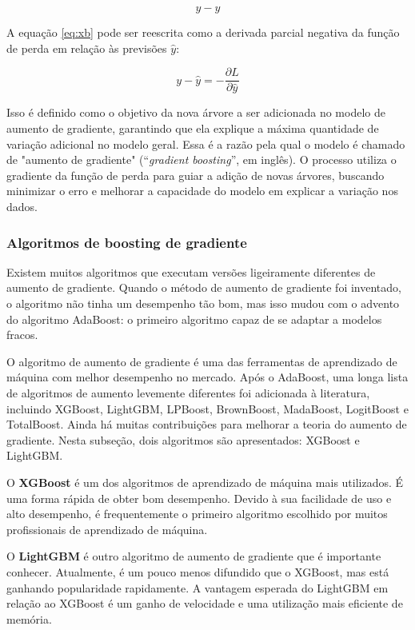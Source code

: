 \begin{equation}
	y-\hat{y} \label{eq:xb}
\end{equation}

A equação \eqref{eq:xb} pode ser reescrita como a derivada parcial negativa da função de perda em relação às previsões $\hat{y}$:

\begin{equation}
	y-\hat{y} = -\frac{\partial L}{\partial \hat{y}} \label{eq:xb2}
\end{equation}

Isso é definido como o objetivo da nova árvore a ser adicionada no modelo de aumento de gradiente, garantindo que ela explique a máxima quantidade de variação adicional no modelo geral. Essa é a razão pela qual o modelo é chamado de "aumento de gradiente" (``\textit{gradient boosting}'', em inglês). O processo utiliza o gradiente da função de perda para guiar a adição de novas árvores, buscando minimizar o erro e melhorar a capacidade do modelo em explicar a variação nos dados.

\subsubsection{Algoritmos de boosting de gradiente}

Existem muitos algoritmos que executam versões ligeiramente diferentes de aumento de gradiente. Quando o método de aumento de gradiente foi inventado, o algoritmo não tinha um desempenho tão bom, mas isso mudou com o advento do algoritmo AdaBoost: o primeiro algoritmo capaz de se adaptar a modelos fracos.

O algoritmo de aumento de gradiente é uma das ferramentas de aprendizado de máquina com melhor desempenho no mercado. Após o AdaBoost, uma longa lista de algoritmos de aumento levemente diferentes foi adicionada à literatura, incluindo XGBoost, LightGBM, LPBoost, BrownBoost, MadaBoost, LogitBoost e TotalBoost. Ainda há muitas contribuições para melhorar a teoria do aumento de gradiente. Nesta subseção, dois algoritmos são apresentados: XGBoost e LightGBM.

O \textbf{XGBoost} é um dos algoritmos de aprendizado de máquina mais utilizados. É uma forma rápida de obter bom desempenho. Devido à sua facilidade de uso e alto desempenho, é frequentemente o primeiro algoritmo escolhido por muitos profissionais de aprendizado de máquina.

O \textbf{LightGBM} é outro algoritmo de aumento de gradiente que é importante conhecer. Atualmente, é um pouco menos difundido que o XGBoost, mas está ganhando popularidade rapidamente. A vantagem esperada do LightGBM em relação ao XGBoost é um ganho de velocidade e uma utilização mais eficiente de memória.

